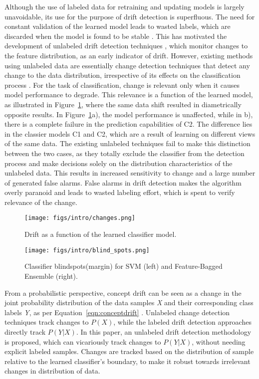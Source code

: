\documentclass[authoryear,3p,times,twocolumn]{elsarticle}
\begin{document}
Although the use of labeled data for retraining and updating models is largely unavoidable, its use for the purpose of drift detection is superfluous. The need for constant validation of the learned model leads to wasted labels, which are discarded when the model is found to be stable \citep{sethi2015don}. This has motivated the development of unlabeled drift detection techniques \citep{ditzler2011hellinger, da2016using}, which monitor changes to the feature distribution, as an early indicator of drift. However, existing methods using unlabeled data are essentially change detection techniques that detect any change to the data distribution, irrespective of its effects on the classification process  \citep{lee2012detection, ditzler2011hellinger, kuncheva2014pca,  qahtan2015pca, da2016using}. For the task of classification, change is relevant only when it causes model performance to degrade. This relevance is a function of the learned model, as illustrated in Figure~\ref{fig:changes}, where the same data shift resulted in diametrically opposite results. In Figure~\ref{fig:changes}a), the model performance is unaffected, while in b), there is a complete failure in the prediction capabilities of C2. The difference lies in the classier models C1 and C2, which are a result of learning on different views of the same data. The existing unlabeled techniques fail to make this distinction between the two cases, as they totally exclude the classifier from the detection process and make decisions solely on the distribution characteristics of the unlabeled data. This results in increased sensitivity to change and a large number of generated false alarms. False alarms in drift detection makes the algorithm overly paranoid and leads to wasted labeling effort, which is spent to verify relevance of the change.

\begin{figure}[t]
  \centering
  \texttt{[image: figs/intro/changes.png]}
   \caption{Drift as a function of the learned classifier model.}
  \label{fig:changes}
\end{figure}

\begin{figure}[t]
  \centering
  \texttt{[image: figs/intro/blind\_spots.png]}
   \caption{Classifier blindspots(margin) for SVM (left) and Feature-Bagged Ensemble (right).}
  \label{fig:blindspots}
\end{figure}

From a probabilistic perspective, concept drift can be seen as a change in the joint probability distribution of the data samples \textit{X} and their corresponding class labels \textit{Y}, as per Equation~\ref{eqn:conceptdrift} \citep{gao2007appropriate}. Unlabeled change detection techniques track changes to $P(X)$, while the labeled drift detection approaches directly track $P(Y|X)$. In this paper, an unlabeled drift detection methodology is proposed, which can vicariously track changes to $P(Y|X)$, without needing explicit labeled samples. Changes are tracked based on the distribution of sample relative to the learned classifier's boundary, to make it robust towards irrelevant changes in distribution of data. 
\end{document}
